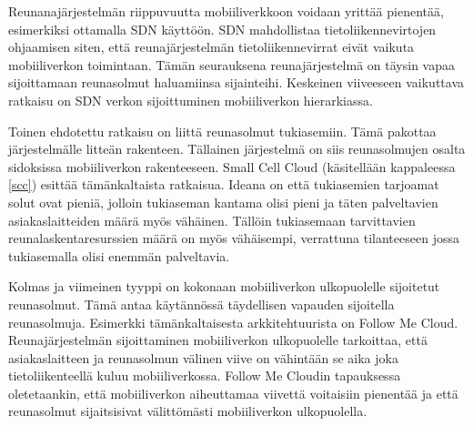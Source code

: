 Reunanajärjestelmän riippuvuutta mobiiliverkkoon voidaan yrittää pienentää, esimerkiksi ottamalla SDN käyttöön. SDN mahdollistaa tietoliikennevirtojen ohjaamisen siten, että reunajärjestelmän tietoliikennevirrat eivät vaikuta mobiiliverkon toimintaan. Tämän seurauksena reunajärjestelmä on täysin vapaa sijoittamaan reunasolmut haluamiinsa sijainteihi. Keskeinen viiveeseen vaikuttava ratkaisu on SDN verkon sijoittuminen mobiiliverkon hierarkiassa.

Toinen ehdotettu ratkaisu on liittä reunasolmut tukiasemiin. Tämä pakottaa järjestelmälle litteän rakenteen.
Tällainen järjestelmä on siis reunasolmujen osalta sidoksissa mobiiliverkon rakenteeseen. Small Cell Cloud (käsitellään kappaleessa \ref{scc}) esittää tämänkaltaista ratkaisua.
Ideana on että tukiasemien tarjoamat solut ovat pieniä, jolloin tukiaseman kantama olisi pieni ja täten palveltavien asiakaslaitteiden määrä myös vähäinen. Tällöin tukiasemaan tarvittavien reunalaskentaresurssien määrä on myös vähäisempi, verrattuna tilanteeseen jossa tukiasemalla olisi enemmän palveltavia. 

Kolmas ja viimeinen tyyppi on kokonaan mobiiliverkon ulkopuolelle sijoitetut reunasolmut. Tämä antaa käytännössä täydellisen vapauden sijoitella reunasolmuja. Esimerkki tämänkaltaisesta arkkitehtuurista on Follow Me Cloud. Reunajärjestelmän sijoittaminen mobiiliverkon ulkopuolelle tarkoittaa, että asiakaslaitteen ja reunasolmun välinen viive on vähintään se aika joka tietoliikenteellä kuluu mobiiliverkossa. Follow Me Cloudin tapauksessa oletetaankin, että mobiiliverkon aiheuttamaa viivettä voitaisiin pienentää ja että reunasolmut sijaitsisivat välittömästi mobiiliverkon ulkopuolella. 
















